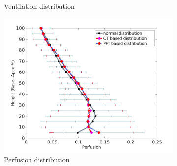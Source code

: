\begin{figure}[htbp]
\begin{subfigure}{.6\linewidth}
  \caption{Ventilation distribution}
  \label{fig:VQDistribution-a} 
\end{subfigure} 
\begin{subfigure}{.6\linewidth}%
  \includegraphics[width=\linewidth,trim={{.0\wd0} {.0\wd0} {.0\wd0} {.0\wd0}},clip]{ModelBasedAnalysis/Image/PerfusionAgainstLungHeight.jpg}
  \caption{Perfusion distribution}
  \label{fig:VQDistribution-b}
\end{subfigure}
\begin{subfigure}{.6\linewidth}%

\end{subfigure}
\end{figure}
